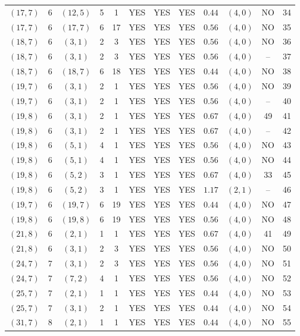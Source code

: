 \begin{longtable}{|c|c|c|c|c|c|c|c|c|c|c|c|}
$(17,7)$ & 6 & $(12,5)$ & 5 & 1 & YES & YES & YES & $0.44$ & $(4,0)$ & NO & 34\\
$(17,7)$ & 6 & $(17,7)$ & 6 & 17 & YES & YES & YES & $0.56$ & $(4,0)$ & NO & 35\\
$(18,7)$ & 6 & $(3,1)$ & 2 & 3 & YES & YES & YES & $0.56$ & $(4,0)$ & NO & 36\\
$(18,7)$ & 6 & $(3,1)$ & 2 & 3 & YES & YES & YES & $0.56$ & $(4,0)$ & -- & 37\\
$(18,7)$ & 6 & $(18,7)$ & 6 & 18 & YES & YES & YES & $0.44$ & $(4,0)$ & NO & 38\\
$(19,7)$ & 6 & $(3,1)$ & 2 & 1 & YES & YES & YES & $0.56$ & $(4,0)$ & NO & 39\\
$(19,7)$ & 6 & $(3,1)$ & 2 & 1 & YES & YES & YES & $0.56$ & $(4,0)$ & -- & 40\\
$(19,8)$ & 6 & $(3,1)$ & 2 & 1 & YES & YES & YES & $0.67$ & $(4,0)$ & 49 & 41\\
$(19,8)$ & 6 & $(3,1)$ & 2 & 1 & YES & YES & YES & $0.67$ & $(4,0)$ & -- & 42\\
$(19,8)$ & 6 & $(5,1)$ & 4 & 1 & YES & YES & YES & $0.56$ & $(4,0)$ & NO & 43\\
$(19,8)$ & 6 & $(5,1)$ & 4 & 1 & YES & YES & YES & $0.56$ & $(4,0)$ & NO & 44\\
$(19,8)$ & 6 & $(5,2)$ & 3 & 1 & YES & YES & YES & $0.67$ & $(4,0)$ & 33 & 45\\
$(19,8)$ & 6 & $(5,2)$ & 3 & 1 & YES & YES & YES & $1.17$ & $(2,1)$ & -- & 46\\
$(19,7)$ & 6 & $(19,7)$ & 6 & 19 & YES & YES & YES & $0.44$ & $(4,0)$ & NO & 47\\
$(19,8)$ & 6 & $(19,8)$ & 6 & 19 & YES & YES & YES & $0.56$ & $(4,0)$ & NO & 48\\
$(21,8)$ & 6 & $(2,1)$ & 1 & 1 & YES & YES & YES & $0.67$ & $(4,0)$ & 41 & 49\\
$(21,8)$ & 6 & $(3,1)$ & 2 & 3 & YES & YES & YES & $0.56$ & $(4,0)$ & NO & 50\\
$(24,7)$ & 7 & $(3,1)$ & 2 & 3 & YES & YES & YES & $0.56$ & $(4,0)$ & NO & 51\\
$(24,7)$ & 7 & $(7,2)$ & 4 & 1 & YES & YES & YES & $0.56$ & $(4,0)$ & NO & 52\\
$(25,7)$ & 7 & $(2,1)$ & 1 & 1 & YES & YES & YES & $0.44$ & $(4,0)$ & NO & 53\\
$(25,7)$ & 7 & $(3,1)$ & 2 & 1 & YES & YES & YES & $0.44$ & $(4,0)$ & NO & 54\\
$(31,7)$ & 8 & $(2,1)$ & 1 & 1 & YES & YES & YES & $0.44$ & $(4,0)$ & NO & 55\\

\end{longtable}
